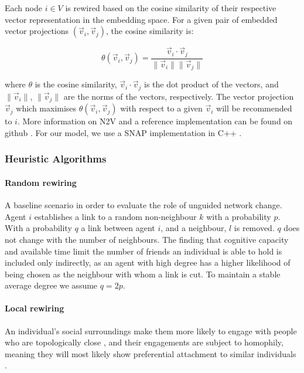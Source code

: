 \documentclass[unnumsec,webpdf,contemporary,large]{oup-authoring-template}%
\theoremstyle{thmstyleone}%
\theoremstyle{thmstyletwo}%
\theoremstyle{thmstylethree}%
\begin{document}
Each node $i \in V$ is rewired based on the cosine similarity of their respective vector representation in the embedding space. For a given pair of embedded vector projections $(\vec{v}_i, \vec{v}_j)$, the cosine similarity is:

\begin{equation}
    \theta(\vec{v}_i, \vec{v}_j) = \frac{\vec{v}_i \cdot \vec{v}_j}{\|\vec{v}_i\| \|\vec{v}_j\|}
\end{equation}

where $\theta$ is the cosine similarity, $\vec{v}_i \cdot \vec{v}_j$ is the dot product of the vectors, and $\|\vec{v}_i\|$, $\|\vec{v}_j\|$ are the norms of the vectors, respectively. The vector projection $\vec{v}_j$ which maximises \(\theta(\vec{v}_i, \vec{v}_j)\) with respect to a given \(\vec{v}_i\) will be recommended to $i$. More information on N2V and a reference implementation can be found on github \cite{groverAdityagrovernode2vec2025a}. For our model, we use a SNAP implementation in C++ \cite{snapSnapstanfordSnap2025}.

\subsubsection{Heuristic Algorithms}\label{sec:heuristicalgs}

\paragraph{Random rewiring}

A baseline scenario in order to evaluate the role of unguided network change. Agent \(i\) establishes a link to a random non-neighbour \(k\) with a probability \(p\). With a probability \(q\) a link between agent \(i\), and a neighbour, \(l\) is removed. \(q\) does not change with the number of neighbours. The finding that cognitive capacity and available time limit the number of friends an individual is able to hold \citep{dunbar_anatomy_2018} is included only indirectly, as an agent with high degree has a higher likelihood of being chosen as the neighbour with whom a link is cut.  To maintain a stable average degree we assume \(q=2p\).

\paragraph{Local rewiring}

An individual's social surroundings make them more likely to engage with people who are topologically close \citep{santos_link_2021,nasiri_new_2021,dunbar_anatomy_2018}, and their engagements are subject to homophily, meaning they will most likely show preferential attachment to similar individuals \citep{williams_network_2015,dunbar_anatomy_2018,kozma_consensus_2008}.
\end{document}

